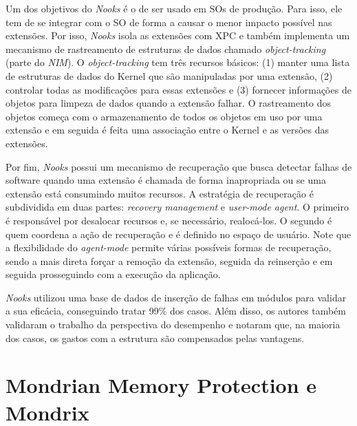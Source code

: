 Um dos objetivos do \emph{Nooks} é o de ser usado em SOs de produção. Para isso,
ele tem de se integrar com o SO de forma a causar o menor impacto possível
nas extensões. Por isso, \emph{Nooks} isola as extensões com XPC e também
implementa um mecanismo de rastreamento de estruturas de dados chamado
\emph{object-tracking} (parte do \emph{NIM}). O \emph{object-tracking} tem três
recursos básicos: (1) manter uma lista de estruturas de dados do Kernel que são
manipuladas por uma extensão, (2) controlar todas as modificações para essas
extensões e (3) fornecer informações de objetos para limpeza de dados quando a
extensão falhar. O rastreamento dos objetos começa com o armazenamento de todos
os objetos em uso por uma extensão e em seguida é feita uma associação entre o
Kernel e as versões das extensões.

Por fim, \emph{Nooks} possui um mecanismo de recuperação que busca detectar
falhas de software quando uma extensão é chamada de forma inapropriada ou se
uma extensão está consumindo muitos recursos. A estratégia de recuperação é
subdividida em duas partes: \emph{recovery management} e \emph{user-mode
agent}. O primeiro é responsável por desalocar recursos e, se necessário,
realocá-los. O segundo é quem coordena a ação de recuperação e
é definido no espaço de usuário. Note que a flexibilidade do \emph{agent-mode}
permite várias possíveis formas de recuperação, sendo a mais direta forçar a
remoção da extensão, seguida da reinserção e em seguida prosseguindo com a
execução da aplicação.

\emph{Nooks} utilizou uma base de dados de inserção de falhas em módulos para
validar a sua eficácia, conseguindo tratar 99\% dos casos. Além disso, os
autores também validaram o trabalho da perspectiva do desempenho e notaram que,
na maioria dos casos, os gastos com a estrutura são compensados pelas vantagens.

\section{Mondrian Memory Protection e Mondrix}

